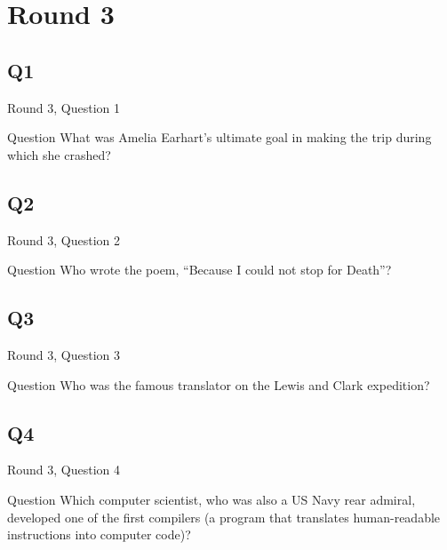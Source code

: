 \documentclass[11pt]{beamer}
\begin{document}
\def\thisSectionName{Women in American History}
\section{Round 3}
    

\subsection*{Q1}
\begin{frame}[t]{Round 3, Question 1}
\vspace{0.5em}
\begin{block}{Question}
What was Amelia Earhart's ultimate goal in making the trip during which she crashed?
\end{block}
\end{frame}
    

\subsection*{Q2}
\begin{frame}[t]{Round 3, Question 2}
\vspace{0.5em}
\begin{block}{Question}
Who wrote the poem, ``Because I could not stop for Death''?
\end{block}
\end{frame}
    

\subsection*{Q3}
\begin{frame}[t]{Round 3, Question 3}
\vspace{0.5em}
\begin{block}{Question}
Who was the famous translator on the Lewis and Clark expedition?
\end{block}
\end{frame}
    

\subsection*{Q4}
\begin{frame}[t]{Round 3, Question 4}
\vspace{0.5em}
\begin{block}{Question}
Which computer scientist, who was also a US Navy rear admiral, developed one of the first compilers (a program that translates human-readable instructions into computer code)?
\end{block}
\end{frame}
    
\end{document}
